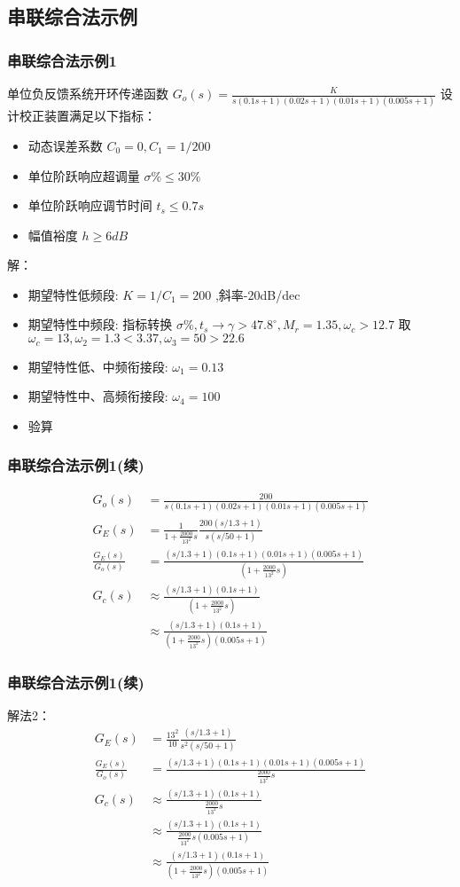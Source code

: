 \documentclass[table]{beamer}
\begin{document}
\subsection{串联综合法示例}
\label{sec-5-2}
\begin{frame}
\frametitle{串联综合法示例1}
\label{sec-5-2-1}

   单位负反馈系统开环传递函数 $G_o(s)=\frac{K}{s(0.1s+1)(0.02s+1)(0.01s+1)(0.005s+1)}$ 设计校正装置满足以下指标：
\begin{itemize}
\item 动态误差系数 $C_0=0,C_1=1/200$
\item 单位阶跃响应超调量 $\sigma\%\leq30\%$
\item 单位阶跃响应调节时间 $t_s\leq 0.7s$
\item 幅值裕度 $h\geq 6dB$
\end{itemize}
解：
\begin{itemize}
\item <2-> 期望特性低频段: $K=1/C_1=200$ ,斜率-20dB/dec
\item <3-> 期望特性中频段: 指标转换 $\sigma\%,t_s\to \gamma>47.8^{\circ},M_r=1.35,\omega_c>12.7$ 取 $\omega_c=13,\omega_2=1.3<3.37,\omega_3=50>22.6$
\item <4-> 期望特性低、中频衔接段: $\omega_1=0.13$
\item <5-> 期望特性中、高频衔接段: $\omega_4=100$
\item <6-> 验算
\end{itemize}
\end{frame}
\begin{frame}
\frametitle{串联综合法示例1(续)}
\label{sec-5-2-2}

\begin{align*}
G_o(s) &=\frac{200}{s(0.1s+1)(0.02s+1)(0.01s+1)(0.005s+1)} \\
G_E(s) &=\frac{1}{1+\frac{2000}{13^2} s}\frac{200(s/1.3+1)}{s(s/50+1)} \\
\frac{G_E(s)}{G_o(s)} &=\frac{(s/1.3+1)(0.1s+1)(0.01s+1)(0.005s+1)}{(1+\frac{2000}{13^2}s)} \\
G_c(s) &\approx \frac{(s/1.3+1)(0.1s+1)}{(1+\frac{2000}{13^2}s)} \\
&\approx \frac{(s/1.3+1)(0.1s+1)}{(1+\frac{2000}{13^2}s)(0.005s+1)}
\end{align*}
\end{frame}
\begin{frame}
\frametitle{串联综合法示例1(续)}
\label{sec-5-2-3}

解法2：
\begin{align*}
G_E(s) &=\frac{13^2}{10}\frac{(s/1.3+1)}{s^2(s/50+1)} \\
\frac{G_E(s)}{G_o(s)} &=\frac{(s/1.3+1)(0.1s+1)(0.01s+1)(0.005s+1)}{\frac{2000}{13^2}s} \\
G_c(s) &\approx \frac{(s/1.3+1)(0.1s+1)}{\frac{2000}{13^2}s} \\
&\approx \frac{(s/1.3+1)(0.1s+1)}{\frac{2000}{13^2}s(0.005s+1)}\\
&\approx \frac{(s/1.3+1)(0.1s+1)}{(1+\frac{2000}{13^2}s)(0.005s+1)}
\end{align*}
\end{frame}
\end{document}
